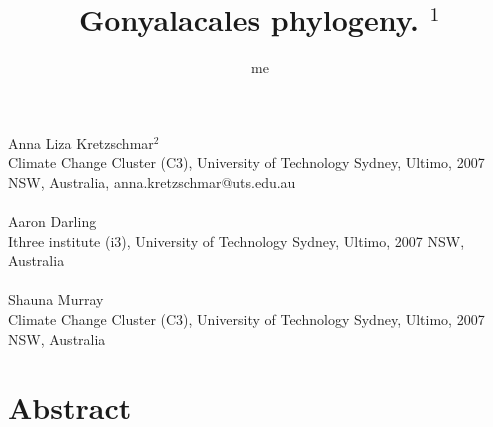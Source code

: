 \documentclass[12pt]{article}
\title{Gonyalacales phylogeny. $^{1}$}
\author{me}
\date{}
\begin{document}
\maketitle
\paragraph{}Anna Liza Kretzschmar$^{2}$\\
Climate Change Cluster (C3), University of Technology Sydney, Ultimo, 2007 NSW, Australia, anna.kretzschmar@uts.edu.au
\paragraph{}Aaron Darling \\
Ithree institute (i3), University of Technology Sydney, Ultimo, 2007 NSW, Australia
\paragraph{}Shauna Murray\\ 
Climate Change Cluster (C3), University of Technology Sydney, Ultimo, 2007 NSW, Australia
\newpage
\section{Abstract}
\end{document}
